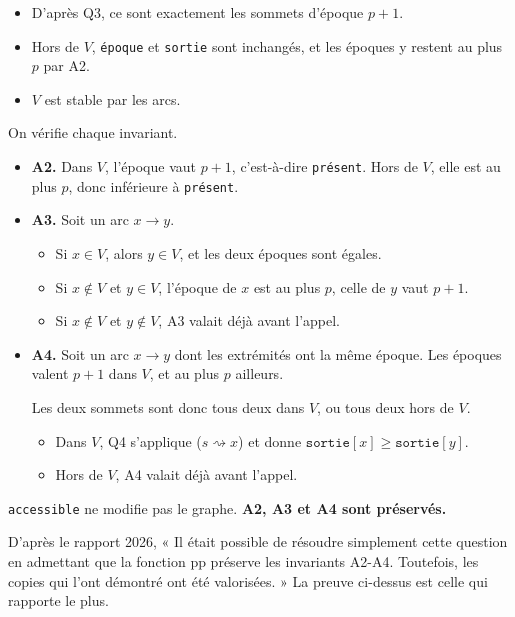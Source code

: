 \documentclass[11pt,a4paper]{article}
\providecommand{\tightlist}{\setlength{\itemsep}{0pt}\setlength{\parskip}{0pt}}
\begin{document}
\begin{itemize}
\tightlist
\item
  D'après Q3, ce sont exactement les sommets d'époque \(p+1\).
\item
  Hors de \(V\), \texttt{époque} et \texttt{sortie} sont inchangés, et les époques y restent au plus \(p\) par A2.
\item
  \(V\) est stable par les arcs.
\end{itemize}

On vérifie chaque invariant.

\begin{itemize}
\item
  \textbf{A2.} Dans \(V\), l'époque vaut \(p+1\), c'est-à-dire \texttt{présent}. Hors de \(V\), elle est au plus \(p\), donc inférieure à \texttt{présent}.
\item
  \textbf{A3.} Soit un arc \(x\to y\).

  \begin{itemize}
  \tightlist
  \item
    Si \(x\in V\), alors \(y\in V\), et les deux époques sont égales.
  \item
    Si \(x\notin V\) et \(y\in V\), l'époque de \(x\) est au plus \(p\), celle de \(y\) vaut \(p+1\).
  \item
    Si \(x\notin V\) et \(y\notin V\), A3 valait déjà avant l'appel.
  \end{itemize}
\item
  \textbf{A4.} Soit un arc \(x\to y\) dont les extrémités ont la même époque. Les époques valent \(p+1\) dans \(V\), et au plus \(p\) ailleurs.

  Les deux sommets sont donc tous deux dans \(V\), ou tous deux hors de \(V\).

  \begin{itemize}
  \tightlist
  \item
    Dans \(V\), Q4 s'applique (\(s\rightsquigarrow x\)) et donne \(\texttt{sortie}[x]\ge\texttt{sortie}[y]\).
  \item
    Hors de \(V\), A4 valait déjà avant l'appel.
  \end{itemize}
\end{itemize}

\texttt{accessible} ne modifie pas le graphe. \textbf{A2, A3 et A4 sont préservés.}

\begin{jury}

D'après le rapport 2026, « Il était possible de résoudre simplement cette question en admettant que la fonction pp préserve les invariants A2-A4. Toutefois, les copies qui l'ont démontré ont été valorisées. » La preuve ci-dessus est celle qui rapporte le plus.

\end{jury}
\end{document}

